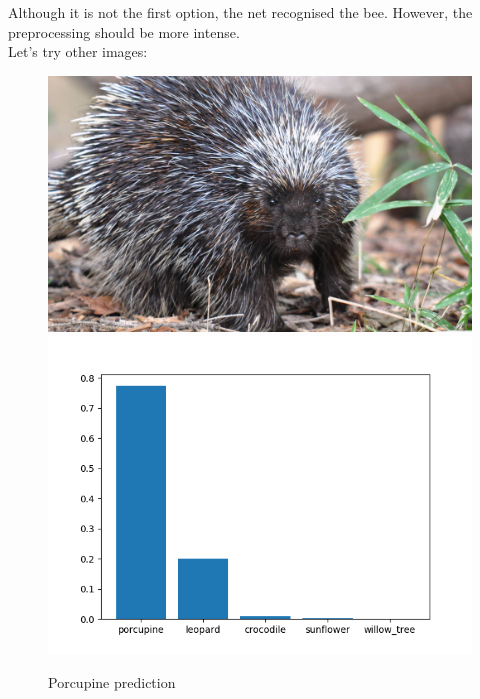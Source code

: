 \documentclass[12pt,spanish]{article}
\begin{document}
Although it is not the first option, the net recognised the bee. However, the preprocessing should be more intense.\\

Let's try other images:

\begin{figure}[H]
\centering
\includegraphics[scale=0.35]{porcupine.jpg}
\includegraphics[scale=0.75]{porcupine_prediction.png}
\caption{Porcupine prediction}
\end{figure}
\end{document}
